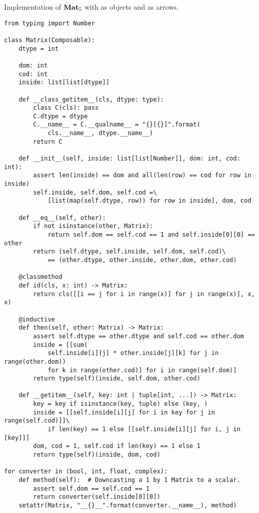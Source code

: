 \begin{python}\label{listing:matrix}
{\normalfont Implementation of $\mathbf{Mat}_\S$ with  as objects and  as arrows.}

\begin{verbatim}
from typing import Number

class Matrix(Composable):
    dtype = int

    dom: int
    cod: int
    inside: list[list[dtype]]

    def __class_getitem__(cls, dtype: type):
        class C(cls): pass
        C.dtype = dtype
        C.__name__ = C.__qualname__ = "{}[{}]".format(
            cls.__name__, dtype.__name__)
        return C

    def __init__(self, inside: list[list[Number]], dom: int, cod: int):
        assert len(inside) == dom and all(len(row) == cod for row in inside)
        self.inside, self.dom, self.cod =\
            [list(map(self.dtype, row)) for row in inside], dom, cod

    def __eq__(self, other):
        if not isinstance(other, Matrix):
            return self.dom == self.cod == 1 and self.inside[0][0] == other
        return (self.dtype, self.inside, self.dom, self.cod)\
            == (other.dtype, other.inside, other.dom, other.cod)

    @classmethod
    def id(cls, x: int) -> Matrix:
        return cls([[i == j for i in range(x)] for j in range(x)], x, x)

    @inductive
    def then(self, other: Matrix) -> Matrix:
        assert self.dtype == other.dtype and self.cod == other.dom
        inside = [[sum(
            self.inside[i][j] * other.inside[j][k] for j in range(other.dom))
            for k in range(other.cod)] for i in range(self.dom)]
        return type(self)(inside, self.dom, other.cod)

    def __getitem__(self, key: int | tuple[int, ...]) -> Matrix:
        key = key if isinstance(key, tuple) else (key, )
        inside = [[self.inside[i][j] for i in key for j in range(self.cod)]]\
            if len(key) == 1 else [[self.inside[i][j] for i, j in [key]]]
        dom, cod = 1, self.cod if len(key) == 1 else 1
        return type(self)(inside, dom, cod)

for converter in (bool, int, float, complex):
    def method(self):  # Downcasting a 1 by 1 Matrix to a scalar.
        assert self.dom == self.cod == 1
        return converter(self.inside[0][0])
    setattr(Matrix, "__{}__".format(converter.__name__), method)
\end{verbatim}


\end{python}
